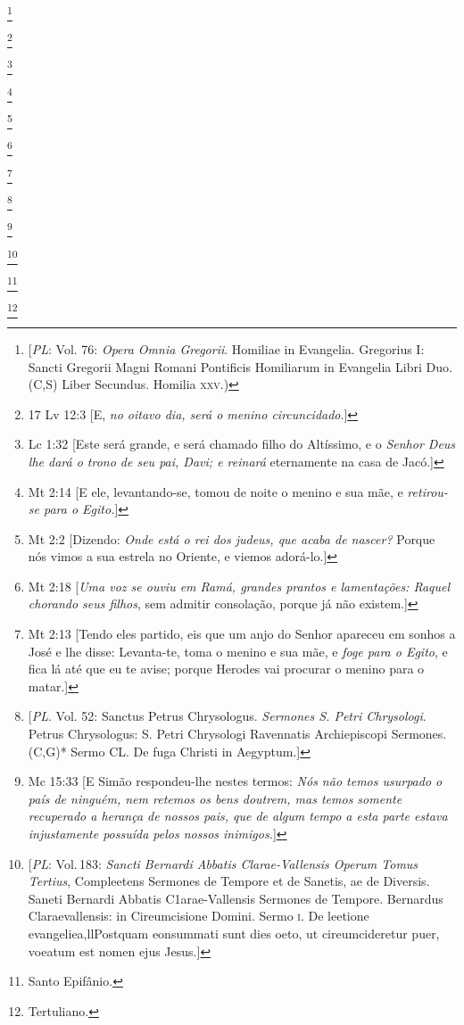 \footnote{[\textit{PL}: Vol. 76: \textit{Opera Omnia Gregorii}. Homiliae in Evangelia. Gregorius I: Sancti Gregorii Magni Romani Pontificis  Homiliarum in Evangelia Libri Duo. (C,S) Liber Secundus. Homilia \textsc{xxv}.)}

\footnote{17 Lv 12:3 [E, \textit{no oitavo dia, será o menino circuncidado}.]}

\footnote{Lc 1:32 [Este será grande, e será chamado filho do Altíssimo, e o \textit{Senhor Deus lhe dará o trono de seu pai, Davi; e reinará} eternamente na casa de Jacó.]}

\footnote{Mt 2:14 [E ele, levantando-se, tomou de noite o menino e sua mãe, e \textit{retirou-se para o Egito.}]}

\footnote{Mt 2:2 [Dizendo: \textit{Onde está o rei dos judeus, que acaba de nascer?} Porque nós vimos a sua estrela no Oriente, e viemos adorá-lo.]}

\footnote{Mt 2:18 [\textit{Uma voz se ouviu em Ramá, grandes prantos e lamentações: Raquel chorando seus filhos}, sem admitir consolação, porque já não existem.]}

\footnote{Mt 2:13 [Tendo eles partido, eis que um anjo do Senhor apareceu em sonhos a José e lhe disse: Levanta-te, toma o menino e sua mãe, e \textit{foge para o Egito}, e fica lá até que eu te avise; porque Herodes vai procurar o menino para o matar.]}

\footnote{[\textit{PL}. Vol. 52: Sanctus Petrus Chrysologus. \textit{Sermones S. Petri Chrysologi}. Petrus Chrysologus: S. Petri Chrysologi Ravennatis Archiepiscopi Sermones. (C,G)* Sermo CL. De fuga Christi in Aegyptum.]}

\footnote{Mc 15:33 [E Simão respondeu-lhe nestes termos: \textit{Nós não temos usurpado o país de ninguém, nem retemos os bens doutrem, mas temos somente recuperado a herança de nossos pais, que de algum tempo a esta parte estava injustamente possuída pelos nossos inimigos.}]}

\footnote{[\textit{PL}: Vol.\,183: \textit{Sancti Bernardi Abbatis Clarae-Vallensis Operum Tomus Tertius}, Compleetens Sermones
de Tempore et de Sanetis, ae de Diversis. Saneti Bernardi Abbatis C1arae-Vallensis Sermones de
Tempore. Bernardus Claraevallensis: in Cireumcisione Domini. Sermo \textsc{i}. De leetione
evangeliea,llPostquam eonsummati sunt dies oeto, ut cireumcideretur puer, voeatum est nomen
ejus Jesus.]}

\footnote{Santo Epifânio.}

\footnote{Tertuliano.}


